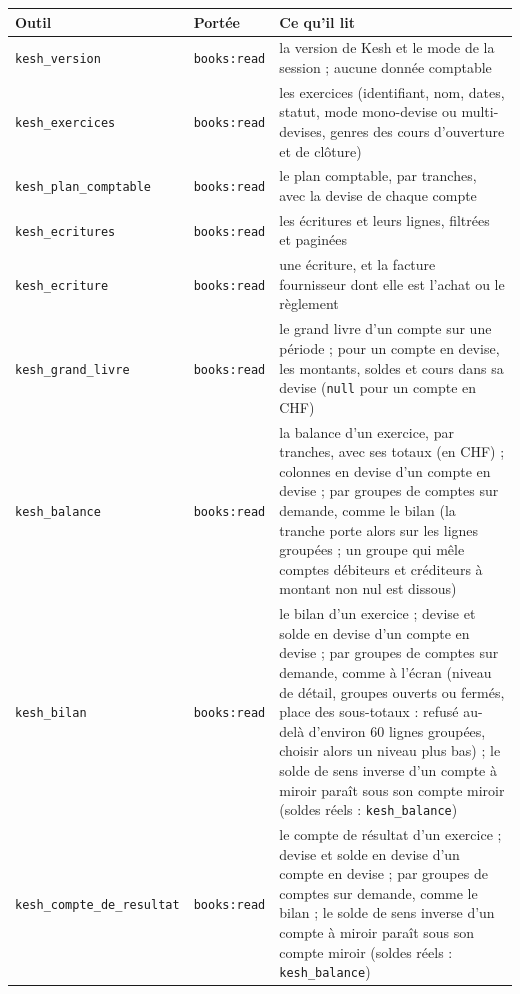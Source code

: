 \documentclass[a4paper,11pt,oneside]{article}
\begin{document}
\begin{center}
\small
\begin{tabular}{p{4.6cm}p{2.4cm}p{7.2cm}}
\textbf{Outil} & \textbf{Portée} & \textbf{Ce qu'il lit} \\
\hline
\texttt{kesh\_version} & \texttt{books:read} & la version de Kesh et le mode de la session ; aucune donnée comptable \\
\texttt{kesh\_exercices} & \texttt{books:read} & les exercices (identifiant, nom, dates, statut, mode mono-devise ou multi-devises, genres des cours d'ouverture et de clôture) \\
\texttt{kesh\_plan\_comptable} & \texttt{books:read} & le plan comptable, par tranches, avec la devise de chaque compte \\
\texttt{kesh\_ecritures} & \texttt{books:read} & les écritures et leurs lignes, filtrées et paginées \\
\texttt{kesh\_ecriture} & \texttt{books:read} & une écriture, et la facture fournisseur dont elle est l'achat ou le règlement \\
\texttt{kesh\_grand\_livre} & \texttt{books:read} & le grand livre d'un compte sur une période ; pour un compte en devise, les montants, soldes et cours dans sa devise (\texttt{null} pour un compte en CHF) \\
\texttt{kesh\_balance} & \texttt{books:read} & la balance d'un exercice, par tranches, avec ses totaux (en CHF) ; colonnes en devise d'un compte en devise ; par groupes de comptes sur demande, comme le bilan (la tranche porte alors sur les lignes groupées ; un groupe qui mêle comptes débiteurs et créditeurs à montant non nul est dissous) \\
\texttt{kesh\_bilan} & \texttt{books:read} & le bilan d'un exercice ; devise et solde en devise d'un compte en devise ; par groupes de comptes sur demande, comme à l'écran (niveau de détail, groupes ouverts ou fermés, place des sous-totaux : refusé au-delà d'environ 60 lignes groupées, choisir alors un niveau plus bas) ; le solde de sens inverse d'un compte à miroir paraît sous son compte miroir (soldes réels : \texttt{kesh\_balance}) \\
\texttt{kesh\_compte\_de\_resultat} & \texttt{books:read} & le compte de résultat d'un exercice ; devise et solde en devise d'un compte en devise ; par groupes de comptes sur demande, comme le bilan ; le solde de sens inverse d'un compte à miroir paraît sous son compte miroir (soldes réels : \texttt{kesh\_balance}) \\

\end{tabular}
\end{center}
\end{document}
